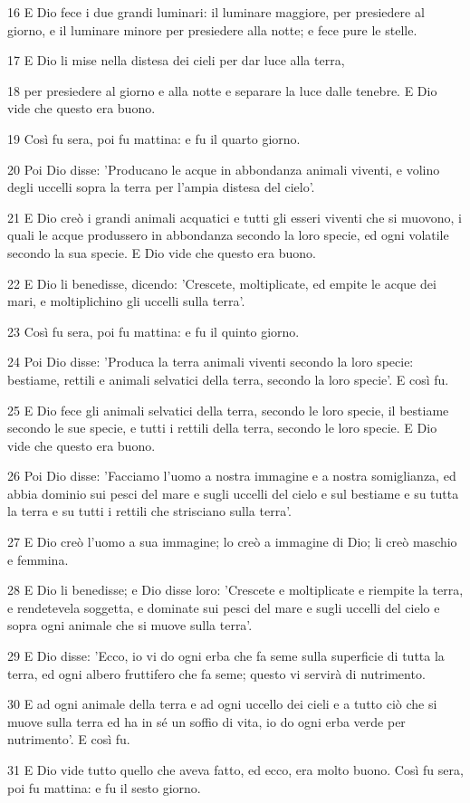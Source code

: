 \par 16 E Dio fece i due grandi luminari: il luminare maggiore, per presiedere al giorno, e il luminare minore per presiedere alla notte; e fece pure le stelle.
\par 17 E Dio li mise nella distesa dei cieli per dar luce alla terra,
\par 18 per presiedere al giorno e alla notte e separare la luce dalle tenebre. E Dio vide che questo era buono.
\par 19 Così fu sera, poi fu mattina: e fu il quarto giorno.
\par 20 Poi Dio disse: 'Producano le acque in abbondanza animali viventi, e volino degli uccelli sopra la terra per l'ampia distesa del cielo'.
\par 21 E Dio creò i grandi animali acquatici e tutti gli esseri viventi che si muovono, i quali le acque produssero in abbondanza secondo la loro specie, ed ogni volatile secondo la sua specie. E Dio vide che questo era buono.
\par 22 E Dio li benedisse, dicendo: 'Crescete, moltiplicate, ed empite le acque dei mari, e moltiplichino gli uccelli sulla terra'.
\par 23 Così fu sera, poi fu mattina: e fu il quinto giorno.
\par 24 Poi Dio disse: 'Produca la terra animali viventi secondo la loro specie: bestiame, rettili e animali selvatici della terra, secondo la loro specie'. E così fu.
\par 25 E Dio fece gli animali selvatici della terra, secondo le loro specie, il bestiame secondo le sue specie, e tutti i rettili della terra, secondo le loro specie. E Dio vide che questo era buono.
\par 26 Poi Dio disse: 'Facciamo l'uomo a nostra immagine e a nostra somiglianza, ed abbia dominio sui pesci del mare e sugli uccelli del cielo e sul bestiame e su tutta la terra e su tutti i rettili che strisciano sulla terra'.
\par 27 E Dio creò l'uomo a sua immagine; lo creò a immagine di Dio; li creò maschio e femmina.
\par 28 E Dio li benedisse; e Dio disse loro: 'Crescete e moltiplicate e riempite la terra, e rendetevela soggetta, e dominate sui pesci del mare e sugli uccelli del cielo e sopra ogni animale che si muove sulla terra'.
\par 29 E Dio disse: 'Ecco, io vi do ogni erba che fa seme sulla superficie di tutta la terra, ed ogni albero fruttifero che fa seme; questo vi servirà di nutrimento.
\par 30 E ad ogni animale della terra e ad ogni uccello dei cieli e a tutto ciò che si muove sulla terra ed ha in sé un soffio di vita, io do ogni erba verde per nutrimento'. E così fu.
\par 31 E Dio vide tutto quello che aveva fatto, ed ecco, era molto buono. Così fu sera, poi fu mattina: e fu il sesto giorno.

